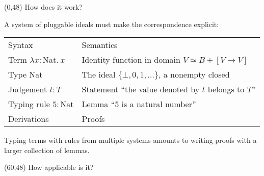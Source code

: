 \documentclass[a0]{a0poster}
\def\FONTSIZE#1{\fontsize{#1}{#1}\selectfont}
\def\HEAD#1{{\FONTSIZE{72}#1}}
\begin{document}
\begin{textblock}{50}(0,48)
\HEAD{How does it work?}

A system of pluggable ideals must make the correspondence
explicit:

{
\renewcommand\arraystretch{1.5}
\begin{tabular}{l@{\hskip 1.5cm}l}
Syntax &
Semantics
\\
Term $\lambda x:\mathrm{Nat}.~x$ &
Identity function in domain $V\simeq B+[V\rightarrow V]$
\\
Type $\mathrm{Nat}$ &
The ideal $\{\bot,0,1,\ldots\}$, a nonempty closed
\\
Judgement $t:T$ &
Statement ``the value denoted by $t$ belongs to $T$''
\\
Typing rule $5:\mathrm{Nat}$ &
Lemma ``5 is a natural number''
\\
Derivations &
Proofs
\end{tabular}
}

Typing terms with rules from multiple systems amounts to writing
proofs with a larger collection of lemmas.
\end{textblock}

\begin{textblock}{50}(60,48)
\HEAD{How applicable is it?}

\end{textblock}
\end{document}
